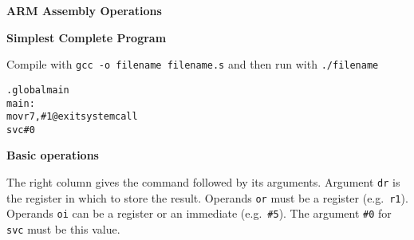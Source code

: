 \documentclass{article}
\begin{document}
\begin{center}
{\LARGE {\bf ARM Assembly Operations}}
\end{center}

\vspace{1em}
\noindent
\textbf{Simplest Complete Program}

Compile with {\tt gcc -o filename filename.s} and then run with {\tt ./filename}
\begin{alltt}
    .global main
    main:
        mov r7, \#1           @exit system call
        svc \#0
\end{alltt}

\vspace{1em}
\noindent
\textbf{Basic operations}

The right column gives the command followed by its arguments.
Argument {\tt dr} is the register in which to store the result.
Operands {\tt or} must be a register (e.g.\ {\tt r1}).
Operands {\tt oi} can be a register or an immediate (e.g.\ {\tt \#5}).
The argument {\tt \#0} for {\tt svc} must be this value.
\end{document}

